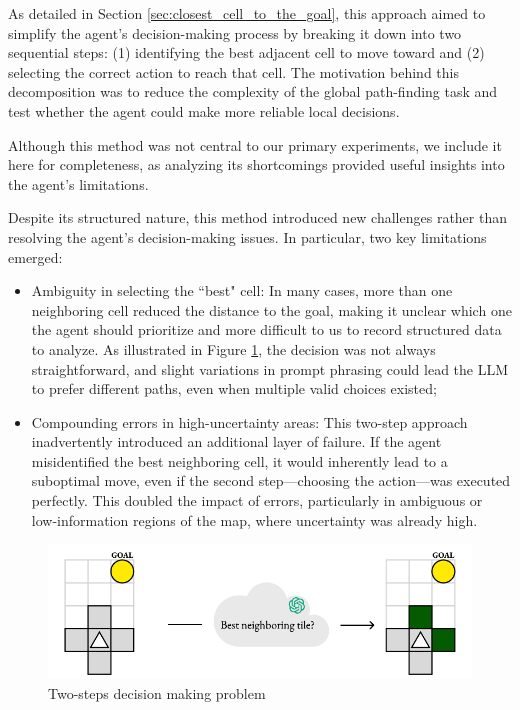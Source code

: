 As detailed in Section \ref{sec:closest_cell_to_the_goal}, this approach aimed
to simplify the agent's decision-making process by breaking it down into two
sequential steps: (1) identifying the best adjacent cell to move toward and (2) selecting
the correct action to reach that cell. The motivation behind this decomposition
was to reduce the complexity of the global path-finding task and test whether
the agent could make more reliable local decisions.

Although this method was not central to our primary experiments, we include it here
for completeness, as analyzing its shortcomings provided useful insights into
the agent's limitations.

Despite its structured nature, this method introduced new challenges rather than
resolving the agent's decision-making issues. In particular, two key limitations
emerged:
\begin{itemize}
  \item Ambiguity in selecting the ``best" cell: In many cases, more than one
    neighboring cell reduced the distance to the goal, making it unclear which one
    the agent should prioritize and more difficult to us to record structured data
    to analyze. As illustrated in Figure \ref{fig:extra2}, the decision was not always
    straightforward, and slight variations in prompt phrasing could lead the LLM
    to prefer different paths, even when multiple valid choices existed;

  \item Compounding errors in high-uncertainty areas: This two-step approach
    inadvertently introduced an additional layer of failure. If the agent misidentified
    the best neighboring cell, it would inherently lead to a suboptimal move, even
    if the second step—choosing the action—was executed perfectly. This doubled
    the impact of errors, particularly in ambiguous or low-information regions of
    the map, where uncertainty was already high.
\end{itemize}

\vspace{7mm}
\begin{figure}[!ht]
  \centering
  \includegraphics[width=.66\textwidth]{images/results_discussion/extra2.pdf}
  \caption{Two-steps decision making problem}
  \label{fig:extra2}
\end{figure}
\vspace{7mm}

